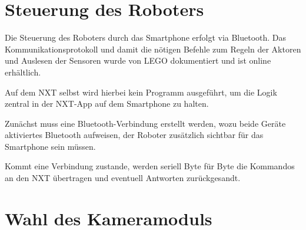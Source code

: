 \pagebreak

\section{Steuerung des Roboters}

Die Steuerung des Roboters durch das Smartphone erfolgt via Bluetooth.
Das Kommunikationsprotokoll und damit die nötigen Befehle zum Regeln der Aktoren und Auslesen der Sensoren wurde von LEGO dokumentiert und ist online erhältlich\cite{nxt_comm_protocol}.

Auf dem NXT selbst wird hierbei kein Programm ausgeführt, um die Logik zentral in der NXT-App auf dem Smartphone zu halten.

Zunächst muss eine Bluetooth-Verbindung erstellt werden, wozu beide Geräte aktiviertes Bluetooth aufweisen, der Roboter zusätzlich sichtbar für das Smartphone sein müssen.

Kommt eine Verbindung zustande, werden seriell Byte für Byte die Kommandos an den NXT übertragen und eventuell Antworten zurückgesandt.

\section{Wahl des Kameramoduls}
\label{sec:Kamera}

